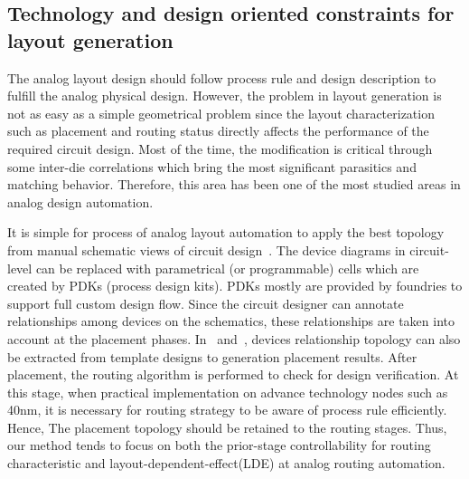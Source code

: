     \subsection{Technology and design oriented constraints for layout generation}\label{subsec:HCDROverview}

      The analog layout design should follow process rule and design description to fulfill the analog physical design. However, the problem in layout generation is not as easy as a simple geometrical problem since the layout characterization such as placement and routing status directly affects the performance of the required circuit design. Most of the time, the modification is critical through some inter-die correlations which bring the most significant parasitics and matching behavior. Therefore, this area has been one of the most studied areas in analog design automation. 

      It is simple for process of analog layout automation to apply the best topology from manual schematic views of circuit design~\cite{ALE-iscas1990}. The device diagrams in circuit-level can be replaced with parametrical (or programmable) cells which are created by PDKs (process design kits). PDKs mostly are provided by foundries to support full custom design flow. Since the circuit designer can annotate relationships among devices on the schematics, these relationships are taken into account at the placement phases. In~\cite{apnsi-pohung-dac07,msc-bhattacharya-tcad06} and~\cite{ALP_YPWeng_iccad2011}, devices relationship topology can also be extracted from template designs to generation placement results. After placement, the routing algorithm is performed to check for design verification. At this stage, when practical implementation on advance technology nodes such as 40nm, it is necessary for routing strategy to be aware of process rule efficiently. Hence, The placement topology should be retained to the routing stages. Thus, our method tends to focus on both the prior-stage controllability for routing characteristic and layout-dependent-effect(LDE) at analog routing automation. 
